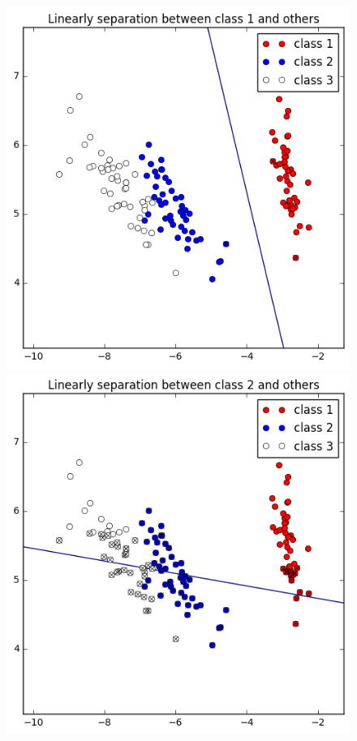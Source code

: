 \documentclass[a4paper,11pt]{article}
\begin{document}
\begin{figure}[htbp]
  \includegraphics[scale=0.3]{l1_23.png}
  \includegraphics[scale=0.3]{l2_13.png}

\end{figure}
\end{document}

